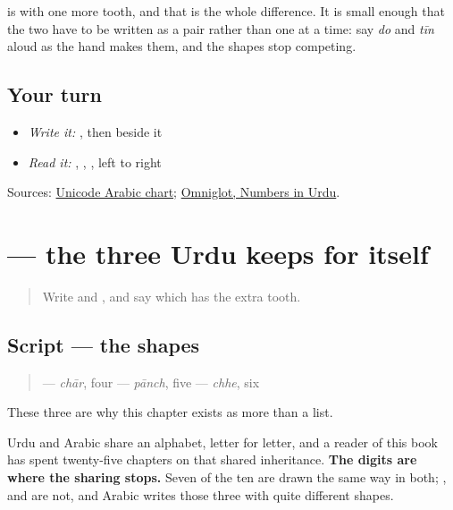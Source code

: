 \textbf{} is \textbf{} with one more tooth, and that is the whole difference. It is small enough that the two have to be written as a pair rather than one at a time: say \emph{do} and \emph{tīn} aloud as the hand makes them, and the shapes stop competing.

\subsection*{Your turn}
\begin{itemize}
\raggedright
  \item \emph{Write it:} \textbf{}, then \textbf{} beside it
  \item \emph{Read it:} \textbf{}, \textbf{}, \textbf{}, left to right
\end{itemize}

\begin{tcolorbox}[breakable,colback=teal!4,colframe=teal!35!black,title={Before you move on}]
Sources: \href{https://www.unicode.org/charts/PDF/U0600.pdf}{Unicode Arabic chart}; \href{https://www.omniglot.com/language/numbers/urdu.htm}{Omniglot, Numbers in Urdu}.
\end{tcolorbox}
\section[\texorpdfstring{\ur{۴} \ur{۵} \ur{۶} (chār pānch chhe)}{۴ ۵ ۶ (chār pānch chhe)}]{   — the three Urdu keeps for itself}

\label{lesson:UR-W31-digits-four-five-six}



\begin{quote}
Write \textbf{} and \textbf{}, and say which has the extra tooth.
\end{quote}

\subsection*{Script — the shapes}
\begin{quote}
\textbf{} — \emph{chār}, four  \textbf{} — \emph{pānch}, five  \textbf{} — \emph{chhe}, six
\end{quote}

These three are why this chapter exists as more than a list.

Urdu and Arabic share an alphabet, letter for letter, and a reader of this book has spent twenty-five chapters on that shared inheritance. \textbf{The digits are where the sharing stops.} Seven of the ten are drawn the same way in both; \textbf{}, \textbf{} and \textbf{} are not, and Arabic writes those three with quite different shapes.

